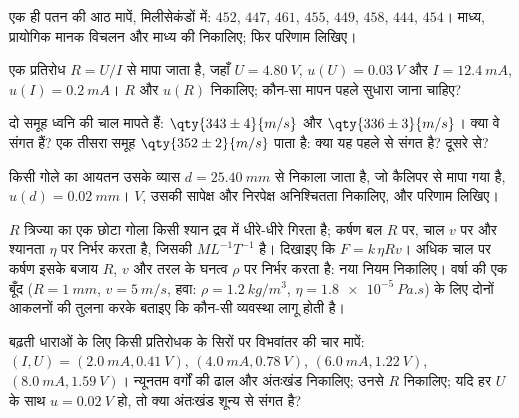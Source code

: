 \begin{exercise}[$\star\star$]\label{exo:b1:units-dimensions:6}
एक ही पतन की आठ मापें, मिलीसेकंडों में: $452$, $447$, $461$,
$455$, $449$, $458$, $444$, $454$। माध्य, प्रायोगिक मानक विचलन और माध्य की
 निकालिए; फिर परिणाम लिखिए।
\end{exercise}

\begin{exercise}[$\star\star$]\label{exo:b1:units-dimensions:7}
एक प्रतिरोध $R = U/I$ से मापा जाता है, जहाँ $U = \qty{4.80}{V}$,
$u(U) = \qty{0.03}{V}$ और $I = \qty{12.4}{mA}$, $u(I) = \qty{0.2}{mA}$।
$R$ और $u(R)$ निकालिए; कौन-सा मापन पहले सुधारा जाना चाहिए?
\end{exercise}

\begin{exercise}[$\star\star$]\label{exo:b1:units-dimensions:8}
दो समूह ध्वनि की चाल मापते हैं: $\qty{343\pm4}{m/s}$ और
$\qty{336\pm3}{m/s}$। क्या वे संगत हैं? एक तीसरा समूह $\qty{352\pm2}{m/s}$
पाता है: क्या यह पहले से संगत है? दूसरे से?
\end{exercise}

\begin{exercise}[$\star\star$]\label{exo:b1:units-dimensions:9}
किसी गोले का आयतन उसके व्यास $d = \qty{25.40}{mm}$ से निकाला जाता है, जो
कैलिपर से मापा गया है, $u(d) = \qty{0.02}{mm}$। $V$, उसकी सापेक्ष और निरपेक्ष
अनिश्चितता निकालिए, और परिणाम लिखिए।
\end{exercise}

\begin{exercise}[$\star\star\star$]\label{exo:b1:units-dimensions:10}
$R$ त्रिज्या का एक छोटा गोला किसी श्यान द्रव में धीरे-धीरे गिरता है; कर्षण बल
$R$ पर, चाल $v$ पर और श्यानता $\eta$ पर निर्भर करता है, जिसकी 
$M L^{-1} T^{-1}$ है। दिखाइए कि $F = k\,\eta R v$। अधिक चाल पर कर्षण इसके
बजाय $R$, $v$ और तरल के घनत्व $\rho$ पर निर्भर करता है: नया नियम निकालिए।
वर्षा की एक बूँद ($R = \qty{1}{mm}$, $v = \qty{5}{m/s}$, हवा:
$\rho = \qty{1.2}{kg/m^3}$, $\eta = \qty{1.8e-5}{Pa.s}$) के लिए दोनों आकलनों
की तुलना करके बताइए कि कौन-सी व्यवस्था लागू होती है।
\end{exercise}

\begin{exercise}[$\star\star\star$]\label{exo:b1:units-dimensions:11}
बढ़ती धाराओं के लिए किसी प्रतिरोधक के सिरों पर विभवांतर की चार मापें:
$(I, U) = (\qty{2.0}{mA}, \qty{0.41}{V})$, $(\qty{4.0}{mA},
\qty{0.78}{V})$, $(\qty{6.0}{mA}, \qty{1.22}{V})$, $(\qty{8.0}{mA},
\qty{1.59}{V})$। न्यूनतम वर्गों की ढाल और अंतःखंड निकालिए; उनसे $R$ निकालिए;
यदि हर $U$ के साथ $u = \qty{0.02}{V}$ हो, तो क्या अंतःखंड शून्य से संगत है?
\end{exercise}

